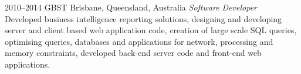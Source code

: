 \begin{entrylist}
\entry
{2010--2014}
{GBST}
{Brisbane, Queensland, Australia}
{\emph{Software Developer} \\
Developed business intelligence reporting solutions, designing and developing server and client based web application code, creation of large scale SQL queries, optimising queries, databases and applications for network, processing and memory constraints, developed back-end server code and front-end web applications.}


\end{entrylist}





